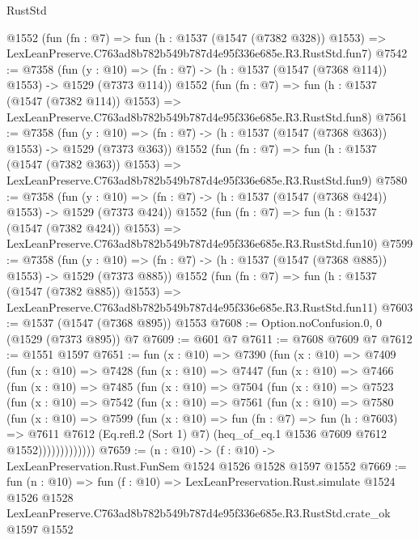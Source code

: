 \begin{lexlean}{RustStd}
\begin{coremodule}
    @1552
    (fun (fn : @7) =>
    fun (h : @1537 (@1547 (@7382 @328)) @1553) =>
    LexLeanPreserve.C763ad8b782b549b787d4e95f336e685e.R3.RustStd.fun7)
@7542 := @7358
    (fun (y : @10) => (fn : @7) -> (h : @1537 (@1547 (@7368 @114)) @1553) -> @1529 (@7373 @114))
    @1552
    (fun (fn : @7) =>
    fun (h : @1537 (@1547 (@7382 @114)) @1553) =>
    LexLeanPreserve.C763ad8b782b549b787d4e95f336e685e.R3.RustStd.fun8)
@7561 := @7358
    (fun (y : @10) => (fn : @7) -> (h : @1537 (@1547 (@7368 @363)) @1553) -> @1529 (@7373 @363))
    @1552
    (fun (fn : @7) =>
    fun (h : @1537 (@1547 (@7382 @363)) @1553) =>
    LexLeanPreserve.C763ad8b782b549b787d4e95f336e685e.R3.RustStd.fun9)
@7580 := @7358
    (fun (y : @10) => (fn : @7) -> (h : @1537 (@1547 (@7368 @424)) @1553) -> @1529 (@7373 @424))
    @1552
    (fun (fn : @7) =>
    fun (h : @1537 (@1547 (@7382 @424)) @1553) =>
    LexLeanPreserve.C763ad8b782b549b787d4e95f336e685e.R3.RustStd.fun10)
@7599 := @7358
    (fun (y : @10) => (fn : @7) -> (h : @1537 (@1547 (@7368 @885)) @1553) -> @1529 (@7373 @885))
    @1552
    (fun (fn : @7) =>
    fun (h : @1537 (@1547 (@7382 @885)) @1553) =>
    LexLeanPreserve.C763ad8b782b549b787d4e95f336e685e.R3.RustStd.fun11)
@7603 := @1537 (@1547 (@7368 @895)) @1553
@7608 := Option.noConfusion.{0, 0} (@1529 (@7373 @895)) @7
@7609 := @601 @7
@7611 := @7608 @7609 @7
@7612 := @1551 @1597
@7651 := fun (x : @10) =>
  @7390
    (fun (x : @10) =>
    @7409
      (fun (x : @10) =>
      @7428
        (fun (x : @10) =>
        @7447
          (fun (x : @10) =>
          @7466
            (fun (x : @10) =>
            @7485
              (fun (x : @10) =>
              @7504
                (fun (x : @10) =>
                @7523
                  (fun (x : @10) =>
                  @7542
                    (fun (x : @10) =>
                    @7561
                      (fun (x : @10) =>
                      @7580
                        (fun (x : @10) =>
                        @7599
                          (fun (x : @10) =>
                          fun (fn : @7) =>
                          fun (h : @7603) =>
                          @7611
                            @7612
                            (Eq.refl.{2} (Sort 1) @7)
                            (heq_of_eq.{1} @1536 @7609 @7612 @1552)))))))))))))
@7659 := (n : @10) -> (f : @10) -> LexLeanPreservation.Rust.FunSem @1524 @1526 @1528 @1597 @1552
@7669 := fun (n : @10) =>
  fun (f : @10) =>
  LexLeanPreservation.Rust.simulate
    @1524
    @1526
    @1528
    LexLeanPreserve.C763ad8b782b549b787d4e95f336e685e.R3.RustStd.crate_ok
    @1597
    @1552
\end{coremodule}
\end{lexlean}
